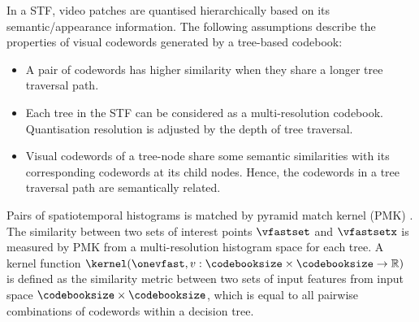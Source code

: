 In a STF, video patches are quantised hierarchically based on its semantic/appearance information. The following assumptions describe the properties of visual codewords generated by a tree-based codebook:
\begin{itemize}
	\item A pair of codewords has higher similarity when they share a longer tree traversal path. 
	\item Each tree in the STF can be considered as a multi-resolution codebook. Quantisation resolution is adjusted by the depth of tree traversal.
	\item Visual codewords of a tree-node share some semantic similarities with its corresponding codewords at its child nodes. Hence, the codewords in a tree traversal path are semantically related. 
\end{itemize} 

Pairs of spatiotemporal histograms is matched by pyramid match kernel (PMK) \cite{Grauman2005}. 
The similarity between two sets of interest points $\vfastset$ and $\vfastsetx$ is measured by PMK from a multi-resolution histogram space for each tree. 
A kernel function $\kernel(\onevfast,v: \codebooksize \times \codebooksize \rightarrow \mathbb{R})$ is defined as the similarity metric between two sets of input features from input space $\codebooksize \times \codebooksize$, which is equal to all pairwise combinations of codewords within a decision tree.  

